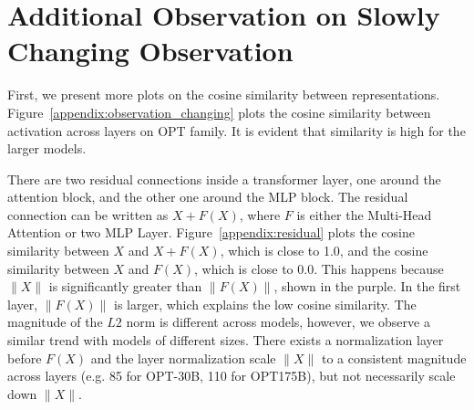 
\section{Additional Observation on Slowly Changing Observation}
\label{sec:appendix-obs}

First, we present more plots on the cosine similarity between representations. Figure~\ref{appendix:observation_changing} plots the cosine similarity between activation across layers on OPT family. It is evident that similarity is high for the larger models.

There are two residual connections inside a transformer layer, one around the attention block, and the other one around the MLP block. The residual connection can be written as $X + F(X)$, where $F$ is either the Multi-Head Attention or two MLP Layer. Figure~\ref{appendix:residual} plots the cosine similarity between $X$ and $X + F(X)$, which is close to 1.0, and the cosine similarity between $X$ and $F(X)$, which is close to 0.0. This happens because $\|X\|$ is significantly greater than $\|F(X)\|$, shown in the purple. In the first layer, $\|F(X)\|$ is larger, which explains the low cosine similarity. The magnitude of the $L2$ norm is different across models, however, we observe a similar trend with models of different sizes. There exists a normalization layer before $F(X)$ and the layer normalization scale $\|X\|$ to a consistent magnitude across layers (e.g. 85 for OPT-30B, 110 for OPT175B), but not necessarily scale down $\|X\|$.

